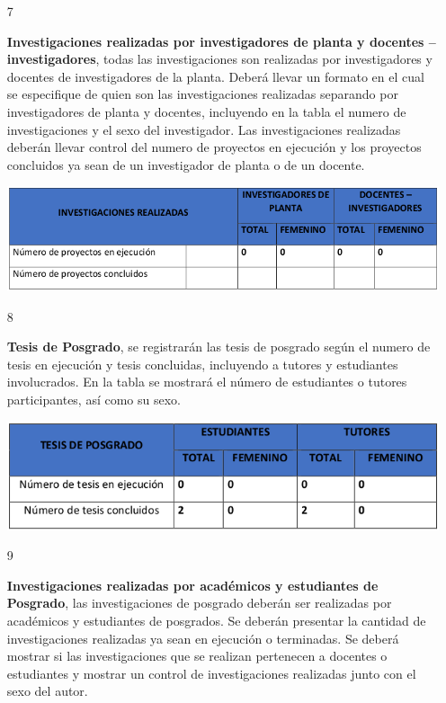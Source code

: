 \documentclass[12pt,letterpaper]{report}
\newcommand{\mb}{\vspace{0.5cm}}
\begin{document}
\begin{itemize}
{\begin{itemize}
\end{itemize}
}


\item[7]{
\textbf{Investigaciones realizadas por investigadores de planta y docentes – investigadores}, todas las investigaciones son realizadas por investigadores y docentes de investigadores de la planta. Deberá llevar un formato en el cual se especifique de quien son las investigaciones realizadas separando por investigadores de planta y docentes, incluyendo en la tabla el numero de investigaciones y el sexo del investigador. Las investigaciones realizadas deberán llevar control del numero de proyectos en ejecución y los proyectos concluidos ya sean de un investigador de planta o de un docente.

\mb
\centering
	\includegraphics[width=\textwidth]{img/tabla7.png}\par
\mb
}


\item[8]{
\textbf{Tesis de Posgrado}, se registrarán las tesis de posgrado según el numero de tesis en ejecución y tesis concluidas, incluyendo a tutores y estudiantes involucrados. En la tabla se mostrará el número de estudiantes o tutores participantes, así como su sexo.

\mb
\centering
	\includegraphics[width=\textwidth]{img/tabla8.png}\par
\mb
}


\item[9]{
\textbf{Investigaciones realizadas por académicos y estudiantes de Posgrado}, las investigaciones de posgrado deberán ser realizadas por académicos y estudiantes de posgrados. Se deberán presentar la cantidad de investigaciones realizadas ya sean en ejecución o terminadas. Se deberá mostrar si las investigaciones que se realizan pertenecen a docentes o estudiantes y mostrar un control de investigaciones realizadas junto con el sexo del autor.

}
\end{itemize}
\end{document}
